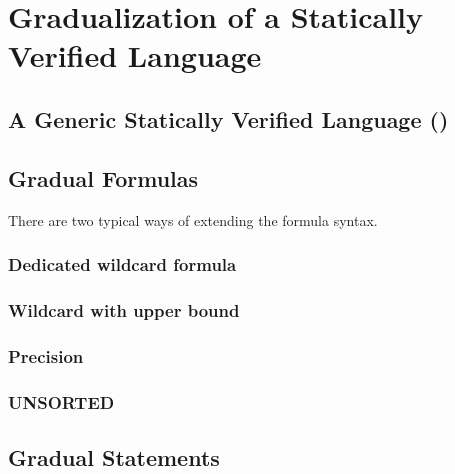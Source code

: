 \chapter{Gradualization of a Statically Verified Language}
\label{ch:gradualization-of-a}


\section{A Generic Statically Verified Language (\gsvl)}
\label{sec:a-statically-verified}


\section{Gradual Formulas}
\label{sec:gradual-formulas}


There are two typical ways of extending the formula syntax.
    \subsection{Dedicated wildcard formula}
    \label{ssec:dedicated-wildcard-formula}
    
    
    \subsection{Wildcard with upper bound}
    \label{ssec:wildcard-with-upper}
    

    \subsection{Precision}
    \label{ssec:precision}
    
    
    \subsection{UNSORTED}
    \label{ssec:gfconclusion}
    
    
    
\section{Gradual Statements}
\label{sec:gradual-statements}


